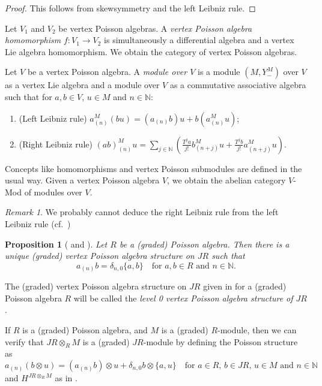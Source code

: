 \documentclass[a4paper, 12pt, reqno]{amsart}
\newtheorem{proposition}[theorem]{Proposition}
\theoremstyle{remark}
\newtheorem{remark}[theorem]{Remark}
\begin{document}
\begin{proof}
  This follows from skewsymmetry and the left Leibniz rule.
\end{proof}

Let $V_1$ and $V_2$ be vertex Poisson algebras.
A \emph{vertex Poisson algebra homomorphism} $f: V_1 \to V_2$ is simultaneously a differential algebra and a vertex Lie algebra homomorphism.
We obtain the category of vertex Poisson algebras.

Let $V$ be a vertex Poisson algebra.
A \emph{module over $V$} is a module $(M, Y^M_-)$ over $V$ as a vertex Lie algebra and a module over $V$ as a commutative associative algebra such that for $a, b \in V$, $u \in M$ and $n \in \mathbb{N}$:
\begin{enumerate}
\item (Left Leibniz rule) $a^M_{(n)}(bu) = (a_{(n)}b)u + b(a^M_{(n)}u)$;
\item (Right Leibniz rule) $(ab)^M_{(n)}u = \sum_{j \in \mathbb{N}}\left(\frac{T^ja}{j!}b^M_{(n + j)}u + \frac{T^jb}{j!}a^M_{(n + j)}u\right)$.
\end{enumerate}
Concepts like homomorphisms and vertex Poisson submodules are defined in the usual way.
Given a vertex Poisson algebra $V$, we obtain the abelian category $V$-Mod of modules over $V$.

\begin{remark}
  \label{rmk:38}
  We probably cannot deduce the right Leibniz rule from the left Leibniz rule (cf.\ )
\end{remark}

\begin{proposition}[{\cite[Proposition 2.3.1]{arakawa_remark_2012}} and {}]
  \label{prp:11}
  Let $R$ be a (graded) Poisson algebra.
  Then there is a unique (graded) vertex Poisson algebra structure on $JR$ such that
  \begin{equation*}
    a_{(n)}b = \delta_{n, 0}\{a, b\} \quad \text{for $a, b \in R$ and $n \in \mathbb{N}$}.
  \end{equation*}
\end{proposition}

The (graded) vertex Poisson algebra structure on $JR$ given in  for a (graded) Poisson algebra $R$ will be called the \emph{level 0 vertex Poisson algebra structure of $JR$}.

If $R$ is a (graded) Poisson algebra, and $M$ is a (graded) $R$-module, then we can verify that $JR \otimes_R M$ is a (graded) $JR$-module by defining the Poisson structure as
\begin{equation*}
  a_{(n)}(b\otimes u) = (a_{(n)}b)\otimes u + \delta_{n, 0}b\otimes\{a, u\} \quad \text{for $a \in R$, $b \in JR$, $u \in M$ and $n \in \mathbb{N}$}
\end{equation*}
and $H^{JR \otimes_R M}$ as in .
\end{document}
